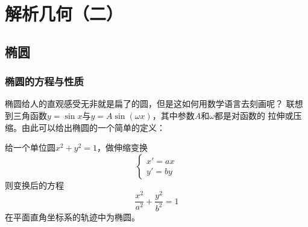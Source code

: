 \chapter{解析几何（二）}
\section{椭圆}
\subsection{椭圆的方程与性质}
椭圆给人的直观感受无非就是扁了的圆，但是这如何用数学语言去刻画呢？
联想到三角函数\(y=\sin x\)与\(y=A\sin(\omega x)\)，其中参数\(A\)和$\omega$都是对函数的
拉伸或压缩。由此可以给出椭圆的一个简单的定义：
\begin{definition}[椭圆的第零定义]
    给一个单位圆\(x^2+y^2=1\)，做伸缩变换
    \[ \left\{
        \begin{array} { l } 
        x'=a x\\
        y'=b y
        \end{array}
    \right.\]
    则变换后的方程
    \[\frac{x^2}{a^2}+\frac{y^2}{b^2}=1\]在平面直角坐标系的轨迹中为椭圆。
\end{definition}

